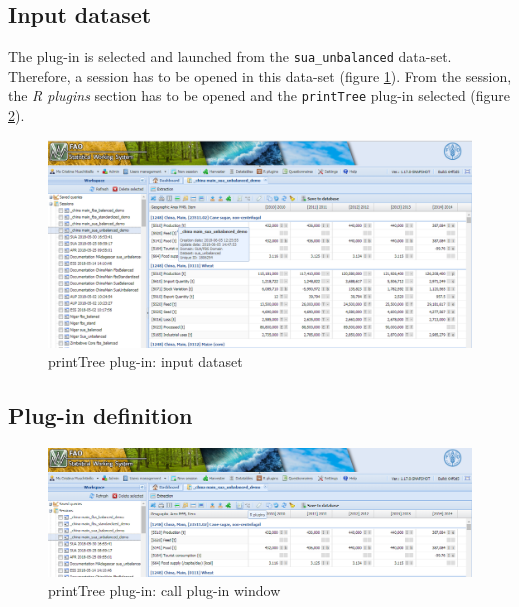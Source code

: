 \documentclass[]{article}
\begin{document}
\subsection{Input dataset}\label{input-dataset}

The plug-in is selected and launched from the \texttt{sua\_unbalanced}
data-set. Therefore, a session has to be opened in this data-set (figure
\ref{fig:f10}). From the session, the \emph{R plugins} section has to be
opened and the \texttt{printTree} plug-in selected (figure
\ref{fig:f11}).

\begin{figure}[H]

{\centering \includegraphics[width=1\linewidth]{images/printTree/10_inputSession} 

}

\caption{\label{fig:f10}printTree plug-in: input dataset}\label{fig:f10}
\end{figure}

\subsection{Plug-in definition}\label{plug-in-definition}

\begin{figure}[H]

{\centering \includegraphics[width=1\linewidth]{images/printTree/11_runbotton} 

}

\caption{\label{fig:f11}printTree plug-in: call plug-in window }\label{fig:f11}
\end{figure}
\end{document}
